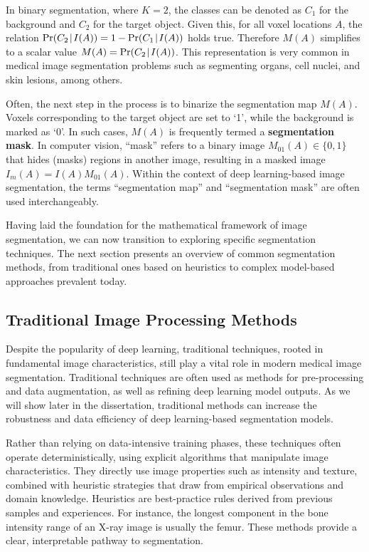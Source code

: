 In binary segmentation, where $K=2$, the classes can be denoted as $C_1$ for the background and $C_2$ for the target object. Given this, for all voxel locations $A$, the relation $\operatorname{Pr}({C_2}\!\mid\!{I(A)}) = 1 - \operatorname{Pr}({C_1}\!\mid\!{I(A)})$ holds true. Therefore $M(A)$ simplifies to a scalar value $M(A) = \operatorname{Pr}({C_2}\!\mid\!{I(A)})$. This representation is very common in medical image segmentation problems such as segmenting organs, cell nuclei, and skin lesions, among others.

Often, the next step in the process is to binarize the segmentation map $M(A)$. Voxels corresponding to the target object are set to `1', while the background is marked as `0'. In such cases, $M(A)$ is frequently termed a \textbf{segmentation mask}. In computer vision, ``mask'' refers to a binary image $M_{01}(A) \in \{0, 1\}$ that hides (masks) regions in another image, resulting in a masked image $I_m(A) = I(A) M_{01}(A)$. Within the context of deep learning-based image segmentation, the terms ``segmentation map'' and ``segmentation mask'' are often used interchangeably.

Having laid the foundation for the mathematical framework of image segmentation, we can now transition to exploring specific segmentation techniques. The next section presents an overview of common segmentation methods, from traditional ones based on heuristics to complex model-based approaches prevalent today.

\subsection{Traditional Image Processing Methods}

Despite the popularity of deep learning, traditional techniques, rooted in fundamental image characteristics, still play a vital role in modern medical image segmentation. Traditional techniques are often used as methods for pre-processing and data augmentation, as well as refining deep learning model outputs. As we will show later in the dissertation, traditional methods can increase the robustness and data efficiency of deep learning-based segmentation models.

Rather than relying on data-intensive training phases, these techniques often operate deterministically, using explicit algorithms that manipulate image characteristics. They directly use image properties such as intensity and texture, combined with heuristic strategies that draw from empirical observations and domain knowledge. Heuristics are best-practice rules derived from previous samples and experiences. For instance, the longest component in the bone intensity range of an X-ray image is usually the femur. These methods provide a clear, interpretable pathway to segmentation.

